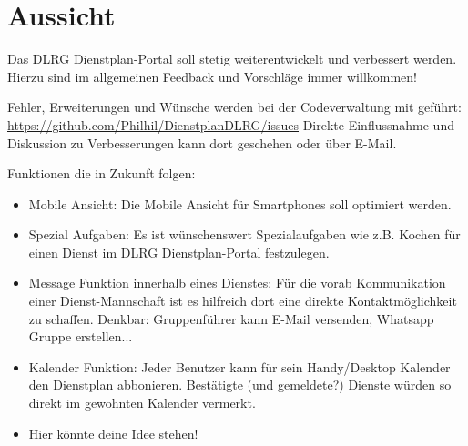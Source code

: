 \chapter{Aussicht}
\label{cha:aussicht}
Das DLRG Dienstplan-Portal soll stetig weiterentwickelt und verbessert werden. Hierzu sind im allgemeinen Feedback und Vorschläge immer willkommen!

\vspace*{5mm} \noindent Fehler, Erweiterungen und Wünsche werden bei der Codeverwaltung mit geführt: \url{https://github.com/Philhil/DienstplanDLRG/issues}
Direkte Einflussnahme und Diskussion zu Verbesserungen kann dort geschehen oder über E-Mail.

\vspace*{5mm} \noindent Funktionen die in Zukunft folgen:

\begin{itemize}
\item Mobile Ansicht: Die Mobile Ansicht für Smartphones soll optimiert werden.
\item Spezial Aufgaben: Es ist wünschenswert Spezialaufgaben wie z.B. Kochen für einen Dienst im DLRG Dienstplan-Portal festzulegen. 
\item Message Funktion innerhalb eines Dienstes: Für die vorab Kommunikation einer Dienst-Mannschaft ist es hilfreich dort eine direkte Kontaktmöglichkeit zu schaffen. Denkbar: Gruppenführer kann E-Mail versenden, Whatsapp Gruppe erstellen...
\item Kalender Funktion: Jeder Benutzer kann für sein Handy/Desktop Kalender den Dienstplan abbonieren. Bestätigte (und gemeldete?) Dienste würden so direkt im gewohnten Kalender vermerkt.
\item Hier könnte deine Idee stehen!
\end{itemize}